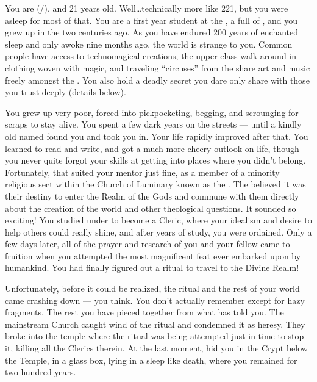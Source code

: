 \documentclass[char]{GL2020}
\begin{document}
\name{\cDisney{}}

You are \cDisney{\full} (\cDisney{\they}/\cDisney{\them}), and 21 years old. Well\ldots{}technically more like 221, but you were asleep for most of that. You are a first year student at the \pSchool{}, a full \cDisney{\cleric} of \cFarmGod{}, and you grew up in the \pFarm{} two centuries ago. As you have endured 200 years of enchanted sleep and only awoke nine months ago, the world is strange to you. Common people have access to technomagical creations, the upper class walk around in clothing woven with magic, and traveling ``circuses'' from the \pTech{} share art and music freely amongst the \pFarmers{}. You also hold a deadly secret you dare only share with those you trust deeply (details below). 

You grew up very poor, forced into pickpocketing, begging, and scrounging for scraps to stay alive. You spent a few dark years on the streets — until a kindly old \cDisneyMentor{\cleric} named \cDisneyMentor{} found you and took you in. Your life rapidly improved after that. You learned to read and write, and got a much more cheery outlook on life, though you never quite forgot your skills at getting into places where you didn't belong. Fortunately, that suited your mentor just fine, as \cDisneyMentor{\they} \cDisneyMentor{\were} a member of a minority religious sect within the Church of Luminary known as the \cDisneySect{}. The \cDisneySect{} believed it was their destiny to enter the Realm of the Gods and commune with them directly about the creation of the world and other theological questions. It sounded so exciting! You studied under \cDisneyMentor{} to become a Cleric, where your idealism and desire to help others could really shine, and after years of study, you were ordained. Only a few days later, all of the prayer and research of you and your fellow \cDisneySect{} came to fruition when you attempted the most magnificent feat ever embarked upon by humankind. You had finally figured out a ritual to travel to the Divine Realm!

Unfortunately, before it could be realized, the ritual and the rest of your world came crashing down — you think. You don't actually remember except for hazy fragments. The rest you have pieced together from what \cWildCard{} has told you. The mainstream Church caught wind of the ritual and condemned it as heresy. They broke into the temple where the ritual was being attempted just in time to stop it, killing all the Clerics therein. At the last moment, \cDisneyMentor{} hid you in the Crypt below the Temple, in a glass box, lying in a sleep like death, where you remained for two hundred years. 
\end{document}
